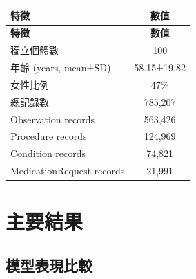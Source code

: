 \documentclass[12pt,a4paper]{article}
\begin{document}
\begin{longtable}{p{6cm}c}
\toprule
\textbf{特徵} & \textbf{數值} \\
\midrule
\endfirsthead

\toprule
\textbf{特徵} & \textbf{數值} \\
\midrule
\endhead

\bottomrule
\endfoot

獨立個體數 & 100 \\
年齡 (years, mean±SD) & 58.15±19.82 \\
女性比例 & 47\% \\
總記錄數 & 785,207 \\
Observation records & 563,426 \\
Procedure records & 124,969 \\
Condition records & 74,821 \\
MedicationRequest records & 21,991 \\
\bottomrule
\end{longtable}

\section{主要結果}

\subsection{模型表現比較}
\end{document}

